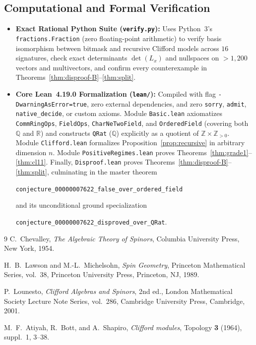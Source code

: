 \documentclass[11pt]{article}
\theoremstyle{definition}
\begin{document}
\subsection*{Computational and Formal Verification}

\begin{itemize}
  \item \textbf{Exact Rational Python Suite (\texttt{verify.py}):} Uses Python~3's
    \texttt{fractions.Fraction} (zero floating-point arithmetic) to verify basis
    isomorphism between bitmask and recursive Clifford models across $16$
    signatures, check exact determinants $\det(L_x)$ and nullspaces on $>1{,}200$
    vectors and multivectors, and confirm every counterexample in
    Theorems~\ref{thm:disproof-B}--\ref{thm:split}.
  \item \textbf{Core Lean~4.19.0 Formalization (\texttt{lean/}):} Compiled with
    flag \texttt{-DwarningAsError=true}, zero external dependencies, and zero
    \texttt{sorry}, \texttt{admit}, \texttt{native\_decide}, or custom axioms.
    Module \texttt{Basic.lean} axiomatizes \texttt{CommRingOps}, \texttt{FieldOps},
    \texttt{CharNeTwoField}, and \texttt{OrderedField} (covering both $\mathbb{Q}$
    and $\mathbb{R}$) and constructs \texttt{QRat} ($\mathbb{Q}$) explicitly as a
    quotient of $\mathbb{Z} \times \mathbb{Z}_{>0}$. Module \texttt{Clifford.lean}
    formalizes Proposition~\ref{prop:recursive} in arbitrary dimension $n$. Module
    \texttt{PositiveRegimes.lean} proves Theorems~\ref{thm:grade1}--\ref{thm:cl11}.
    Finally, \texttt{Disproof.lean} proves
    Theorems~\ref{thm:disproof-B}--\ref{thm:split}, culminating in the master
    theorem
    \begin{center}
      \texttt{conjecture\_00000007622\_false\_over\_ordered\_field}
    \end{center}
    and its unconditional ground specialization
    \begin{center}
      \texttt{conjecture\_00000007622\_disproved\_over\_QRat}.
    \end{center}
\end{itemize}

\begin{thebibliography}{9}
C.~Chevalley, \emph{The Algebraic Theory of Spinors}, Columbia University Press,
New York, 1954.

H.~B.~Lawson and M.-L.~Michelsohn, \emph{Spin Geometry}, Princeton Mathematical
Series, vol.~38, Princeton University Press, Princeton, NJ, 1989.

P.~Lounesto, \emph{Clifford Algebras and Spinors}, 2nd ed., London Mathematical
Society Lecture Note Series, vol.~286, Cambridge University Press, Cambridge, 2001.

M.~F.~Atiyah, R.~Bott, and A.~Shapiro, \emph{Clifford modules}, Topology
\textbf{3} (1964), suppl.~1, 3--38.
\end{thebibliography}
\end{document}
